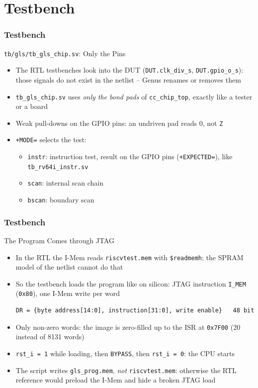 \documentclass{beamer}
\newcommand{\astitle}{nix}
\newcommand{\assubtitle}{nix}
\newcommand{\cmd}[1]{\texttt{#1}}
\begin{document}
\section{Testbench}
\renewcommand{\astitle}{Testbench}

\renewcommand{\assubtitle}{\texttt{tb/gls/tb\_gls\_chip.sv}: Only the Pins}
\begin{frame}
\frametitle{\astitle}
\begin{block}{\assubtitle}
  \begin{itemize}
    \item The RTL testbenches look into the DUT
      (\cmd{DUT.clk\_div\_s}, \cmd{DUT.gpio\_o\_s}): those signals do not
      exist in the netlist -- Genus renames or removes them
    \item \cmd{tb\_gls\_chip.sv} uses \emph{only the bond pads} of
      \cmd{cc\_chip\_top}, exactly like a tester or a board
    \item Weak pull-downs on the GPIO pins: an undriven pad reads 0, not
      \cmd{Z}
    \item \cmd{+MODE=} selects the test:
    \begin{itemize}
      \item \cmd{instr}: instruction test, result on the GPIO pins
        (\cmd{+EXPECTED=}), like \cmd{tb\_rv64i\_instr.sv}
      \item \cmd{scan}: internal scan chain
      \item \cmd{bscan}: boundary scan
    \end{itemize}
  \end{itemize}
\end{block}
\end{frame}

\renewcommand{\assubtitle}{The Program Comes through JTAG}
\begin{frame}[fragile]
\frametitle{\astitle}
\begin{block}{\assubtitle}
  \begin{itemize}
    \item In the RTL the I-Mem reads \cmd{riscvtest.mem} with
      \cmd{\$readmemh}; the SPRAM model of the netlist cannot do that
    \item So the testbench loads the program like on silicon: JTAG
      instruction \cmd{I\_MEM} (\cmd{0x80}), one I-Mem write per word
\begin{lstlisting}
DR = {byte address[14:0], instruction[31:0], write enable}   48 bit
\end{lstlisting}
    \item Only non-zero words: the image is zero-filled up to the ISR at
      \cmd{0x7F00} (20 instead of 8131 words)
    \item \cmd{rst\_i = 1} while loading, then \cmd{BYPASS}, then
      \cmd{rst\_i = 0}: the CPU starts
    \item The script writes \cmd{gls\_prog.mem}, \emph{not}
      \cmd{riscvtest.mem}: otherwise the RTL reference would preload the
      I-Mem and hide a broken JTAG load
  \end{itemize}
\end{block}
\end{frame}
\end{document}
